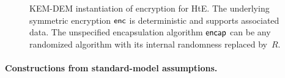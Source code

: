 \begin{figure}[tbhp]
\begin{center}
%
\caption{KEM-DEM instantiation of encryption for HtE.  The underlying symmetric encryption ${\mathsf{enc}}$ is deterministic and supports associated data. The unspecified encapsulation algorithm $\mathsf{encap}$ can be any randomized algorithm with its internal randomness replaced by~$R$.  
}
\label{fig:kem-dem-HtE}
\end{center}
\end{figure}

\paragraph{Constructions from standard-model assumptions. } 


